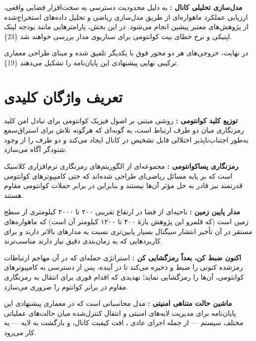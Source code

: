 \documentclass[a4paper,14pt]{extreport}
\begin{document}
\textbf{مدل‌سازی تحلیلی کانال :} به دلیل محدودیت دسترسی به سخت‌افزار فضایی واقعی، ارزیابی عملکرد  ماهواره‌ای از طریق مدل‌سازی ریاضی  و تحلیل داده‌های استخراج‌شده از پژوهش‌های معتبر پیشین انجام می‌شود. در این بخش، پارامترهایی مانند بودجه لینک اپتیکی  و نرخ خطای بیت کوانتومی  برای سناریوی مدار  بررسی خواهند شد \{23\}.

در نهایت، خروجی‌های هر دو محور فوق با یکدیگر تلفیق شده و مبنای طراحی معماری ترکیبی نهایی  پیشنهادی این پایان‌نامه را تشکیل می‌دهند \{19\}.

\section{تعریف واژگان کلیدی}

\textbf{توزیع کلید کوانتومی :} روشی مبتنی بر اصول فیزیک کوانتومی برای تبادل امن کلید رمزنگاری میان دو طرف ارتباط است، به گونه‌ای که هرگونه تلاش برای استراق‌سمع  به‌طور اجتناب‌ناپذیر اختلالی قابل تشخیص در کانال ایجاد می‌کند و دو طرف را از وجود شنودگر آگاه می‌سازد.

\textbf{رمزنگاری پساکوانتومی :} مجموعه‌ای از الگوریتم‌های رمزنگاری نرم‌افزاری کلاسیک است که بر پایه مسائل ریاضی‌ای طراحی شده‌اند که حتی کامپیوترهای کوانتومی قدرتمند نیز قادر به حل مؤثر آن‌ها نیستند و بنابراین در برابر حملات کوانتومی مقاوم  هستند.

\textbf{مدار پایین زمین :} ناحیه‌ای از فضا در ارتفاع تقریبی ۲۰۰ تا ۲۰۰۰ کیلومتری از سطح زمین است (که قلمرو این پژوهش بازهٔ ۴۰۰ تا ۱۲۰۰ کیلومتر آن است) که ماهواره‌های مستقر در آن تأخیر انتشار سیگنال  بسیار پایین‌تری نسبت به مدارهای بالاتر دارند و برای کاربردهایی که به زمان‌بندی دقیق نیاز دارند مناسب‌ترند.

\textbf{اکنون ضبط کن، بعداً رمزگشایی کن :} استراتژی حمله‌ای که در آن مهاجم ارتباطات رمزشده کنونی را ضبط و ذخیره می‌کند تا در آینده، پس از دسترسی به کامپیوترهای کوانتومی، آن‌ها را رمزگشایی نماید؛ تهدیدی که اقدام فوری برای انتقال به رمزنگاری مقاوم در برابر کوانتوم را ضروری می‌سازد.

\textbf{ماشین حالت متناهی امنیتی :} مدل محاسباتی است که در معماری پیشنهادی این پایان‌نامه برای مدیریت لایه‌های امنیتی و انتقال کنترل‌شده میان حالت‌های عملیاتی مختلف سیستم --- از جمله اجرای عادی ، افت کیفیت کانال، و بازگشت به لایه  --- به کار می‌رود.
\end{document}
